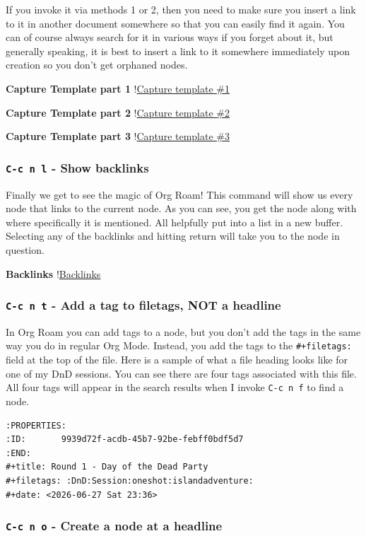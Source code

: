 \documentclass[11pt]{article}
\begin{document}
If you invoke it via methods 1 or 2, then you need to make sure you insert a link to it in another document somewhere so that you can easily find it again. You can of course always search for it in various ways if you forget about it, but generally speaking, it is best to insert a link to it somewhere immediately upon creation so you don't get orphaned nodes.

\textbf{Capture Template part 1}
!\href{images/org-roam-capture-temlate-1.png}{Capture template \#1}

\textbf{Capture Template part 2}
!\href{images/org-roam-capture-temlate-2.png}{Capture template \#2}

\textbf{Capture Template part 3}
!\href{images/org-roam-capture-temlate-3.png}{Capture template \#3}
\subsubsection*{\texttt{C-c n l} - Show backlinks}
\label{sec:orgd9444bf}

Finally we get to see the magic of Org Roam! This command will show us every node that links to the current node. As you can see, you get the node along with where specifically it is mentioned. All helpfully put into a list in a new buffer. Selecting any of the backlinks and hitting return will take you to the node in question.

\textbf{Backlinks}
!\href{images/org-roam-backlinks.png}{Backlinks}
\subsubsection*{\texttt{C-c n t} - Add a tag to filetags, NOT a headline}
\label{sec:orgd9f8147}

In Org Roam you can add tags to a node, but you don't add the tags in the same way you do in regular Org Mode. Instead, you add the tags to the \texttt{\#+filetags:} field at the top of the file. Here is a sample of what a file heading looks like for one of my DnD sessions. You can see there are four tags associated with this file. All four tags will appear in the search results when I invoke \texttt{C-c n f} to find a node.

\begin{verbatim}
:PROPERTIES:
:ID:       9939d72f-acdb-45b7-92be-febff0bdf5d7
:END:
#+title: Round 1 - Day of the Dead Party
#+filetags: :DnD:Session:oneshot:islandadventure:
#+date: <2026-06-27 Sat 23:36>
\end{verbatim}
\subsubsection*{\texttt{C-c n o} - Create a node at a headline}
\label{sec:orgf8fee23}
\end{document}
